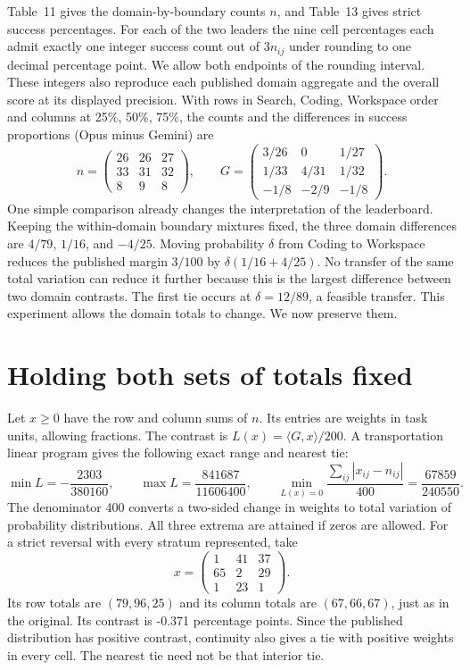 \documentclass[11pt]{article}
\begin{document}
Table~11 gives the domain-by-boundary counts $n$, and Table~13 gives strict success percentages. For each of the two leaders the nine cell percentages each admit exactly one integer success count out of $3n_{ij}$ under rounding to one decimal percentage point. We allow both endpoints of the rounding interval. These integers also reproduce each published domain aggregate and the overall score at its displayed precision. With rows in Search, Coding, Workspace order and columns at 25\%, 50\%, 75\%, the counts and the differences in success proportions (Opus minus Gemini) are
\[
 n=\begin{pmatrix}26&26&27\\33&31&32\\8&9&8\end{pmatrix},
 \qquad G=\begin{pmatrix}3/26&0&1/27\\1/33&4/31&1/32\\-1/8&-2/9&-1/8\end{pmatrix}.
\]
One simple comparison already changes the interpretation of the leaderboard. Keeping the within-domain boundary mixtures fixed, the three domain differences are $4/79$, $1/16$, and $-4/25$. Moving probability $\delta$ from Coding to Workspace reduces the published margin $3/100$ by $\delta(1/16+4/25)$. No transfer of the same total variation can reduce it further because this is the largest difference between two domain contrasts. The first tie occurs at $\delta=12/89$, a feasible transfer. This experiment allows the domain totals to change. We now preserve them.

\section{Holding both sets of totals fixed}
Let $x\geq0$ have the row and column sums of $n$. Its entries are weights in task units, allowing fractions. The contrast is $L(x)=\langle G,x\rangle/200$. A transportation linear program gives the following exact range and nearest tie:
\[
  \min L=\textstyle -\frac{2303}{380160},\qquad \max L=\textstyle \frac{841687}{11606400},\qquad
  \min_{L(x)=0}\frac{\sum_{ij}|x_{ij}-n_{ij}|}{400}=\textstyle \frac{67859}{240550}.
\]
The denominator 400 converts a two-sided change in weights to total variation of probability distributions. All three extrema are attained if zeros are allowed. For a strict reversal with every stratum represented, take
\[
x=\begin{pmatrix}1&41&37\\65&2&29\\1&23&1\end{pmatrix}.
\]
Its row totals are $(79,96,25)$ and its column totals are $(67,66,67)$, just as in the original. Its contrast is -0.371 percentage points. Since the published distribution has positive contrast, continuity also gives a tie with positive weights in every cell. The nearest tie need not be that interior tie.
\end{document}
